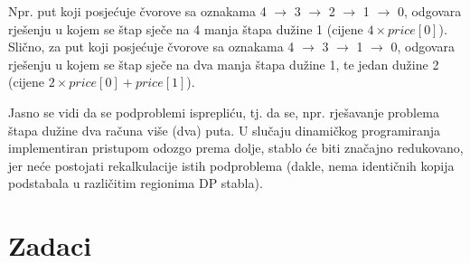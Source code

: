   Npr. put koji posjećuje čvorove sa oznakama 4 $\rightarrow$ 3 $\rightarrow$ 2 $\rightarrow$ 1 $\rightarrow$ 0, odgovara rješenju u kojem se štap sječe na 4 manja štapa dužine 1 (cijene $4 \times price[0]$). Slično, za put koji posjećuje čvorove sa oznakama 4 $\rightarrow$ 3 $\rightarrow$ 1 $\rightarrow$ 0, odgovara rješenju u kojem se štap sječe na dva manja štapa dužine 1, te jedan dužine 2 (cijene $2 \times price[0] + price[1]$).   
  
   Jasno se vidi da se podproblemi isprepliću, tj. da se, npr. rješavanje problema štapa dužine dva računa više (dva) puta. U slučaju dinamičkog programiranja implementiran  pristupom odozgo prema dolje, stablo će biti značajno redukovano, jer neće postojati rekalkulacije istih podproblema (dakle, nema identičnih kopija podstabala u različitim regionima DP stabla). 
 

\section{Zadaci}

